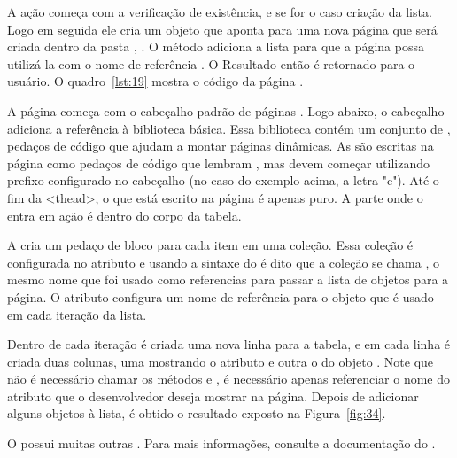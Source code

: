 A ação começa com a verificação de existência, e se for o caso criação da lista. Logo em seguida ele cria um objeto  que aponta para uma nova página que será criada dentro da pasta , . O método  adiciona a lista  para que a página possa utilizá-la com o nome de referência . O Resultado então é retornado para o usuário. O quadro~\ref{lst:19} mostra o código da página .


A página começa com o cabeçalho padrão de páginas . Logo abaixo, o cabeçalho  adiciona a referência à biblioteca  básica. Essa biblioteca contém um conjunto de  , pedaços de código  que ajudam a montar páginas dinâmicas. As   são escritas na página como pedaços de código que lembram  , mas devem começar utilizando prefixo configurado no cabeçalho  (no caso do exemplo acima, a letra "c"). Até o fim da   <thead>, o que está escrito na página é apenas  puro. A parte onde o  entra em ação é dentro do corpo da tabela. 

A   cria um pedaço de bloco  para cada item em uma coleção. Essa coleção é configurada no atributo  e usando a sintaxe do  é dito que a coleção se chama , o mesmo nome que foi usado como referencias para passar a lista de objetos  para a página. O atributo  configura um nome de referência para o objeto que é usado em cada iteração da lista.

Dentro de cada iteração é criada uma nova linha para a tabela, e em cada linha é criada duas colunas, uma mostrando o atributo  e outra o  do objeto . Note que não é necessário chamar os métodos  e , é necessário apenas referenciar o nome do atributo que o desenvolvedor deseja mostrar na página. Depois de adicionar alguns objetos à lista, é obtido o resultado exposto na Figura~\ref{fig:34}.


O  possui muitas outras . Para mais informações, consulte a documentação do .

